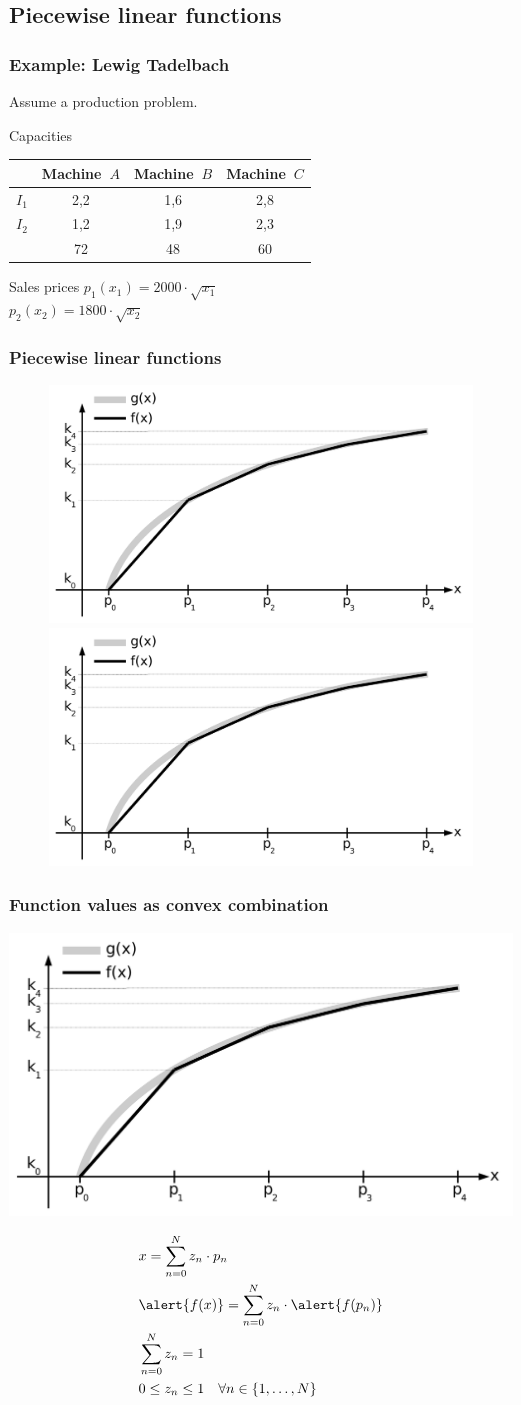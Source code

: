 \subsection{Piecewise linear functions}
\begin{frame}
 \frametitle{Example: Lewig Tadelbach}
 Assume a production problem.
 
 \begin{block}{Capacities}
	\begin{center}\upshape\small
	\begin{tabular}{lccc}
	 \toprule
	  & Machine~$A$ & Machine~$B$ & Machine~$C$ \\
	 \midrule
	 $I_1$ & 2,2 & 1,6 & 2,8\\
	 $I_2$ & 1,2 & 1,9 & 2,3\\
	 \midrule
	  & 72 & 48 & 60 \\
	 \bottomrule
	\end{tabular}
	\end{center}
  \end{block}
  
  \begin{block}{Sales prices}\centering
	$p_1(x_1) = 2000\cdot\sqrt{x_1}$\\
	$p_2(x_2) = 1800\cdot\sqrt{x_2}$ 
  \end{block}
\end{frame}

\begin{frame}
 \frametitle{Piecewise linear functions}
 \begin{figure}
  \centering
  \includegraphics<1>[width=\linewidth,page=1]{Bilder/StueckweiseLineareFunktion1}
  \includegraphics<2>[width=\linewidth,page=2]{Bilder/StueckweiseLineareFunktion1}
 \end{figure}
\end{frame}

\begin{frame}
 \frametitle{Function values as convex combination}
 \begin{flushright}
  \includegraphics[width=.5\textwidth,page=2]{Bilder/StueckweiseLineareFunktion1}
 \end{flushright}
 \vspace{-5ex}
 \begin{align*}
  &x = \sum_{n=0}^{N} z_n\cdot p_n\\
  &\alert{f(x)} = \sum_{n=0}^{N} z_n\cdot \alert{f(p_n)}\\
  &\sum_{n=0}^N z_n = 1\\
  &0 \leq z_n \leq 1\quad\forall n\in\{1, \ldots, N\}\qquad\qquad\mbox{}
 \end{align*}
\end{frame}

